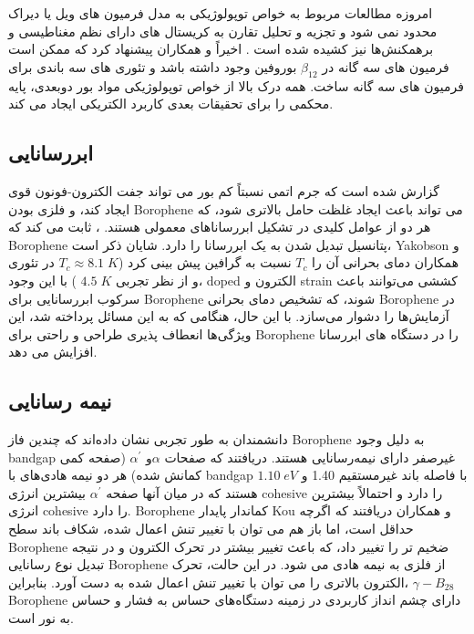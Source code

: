 امروزه مطالعات مربوط به خواص توپولوژیکی به مدل فرمیون های ویل یا دیراک محدود نمی شود و تجزیه و تحلیل تقارن به کریستال های دارای نظم مغناطیسی و برهمکنش‌ها نیز کشیده شده است \cite{bradlynDiracWeylFermions2016}. اخیراً  و همکاران \cite{ezawaTripletFermionsDirac2017} پیشنهاد کرد که ممکن است فرمیون های سه گانه در $\beta_{12}$ بوروفین وجود داشته باشد و تئوری های سه باندی برای فرمیون های سه گانه ساخت. همه درک بالا از خواص توپولوژیکی مواد بور دوبعدی، پایه محکمی را برای تحقیقات بعدی کاربرد الکتریکی ایجاد می کند.\cite{fanCatScradlelikeDirac2018}
\subsection{ابررسانایی}
گزارش شده است که جرم اتمی نسبتاً کم بور می تواند جفت الکترون-فونون قوی ایجاد کند، و فلزی بودن \gls{Borophene} می تواند باعث ایجاد غلظت حامل بالاتری شود، \cite{kortusSuperconductivityMetallicBoron2001, choiOriginAnomalousSuperconducting2002, anSuperconductivityMgB2Covalent2001} که هر دو از عوامل کلیدی در تشکیل ابررساناهای معمولی هستند. ، ثابت می کند که \gls{Borophene} پتانسیل تبدیل شدن به یک ابررسانا را دارد. شایان ذکر است، \gls{Yakobson} و همکاران \cite{penevCanTwoDimensionalBoron2016} دمای بحرانی آن را $T_c$ نسبت به گرافین پیش بینی کرد ($T_c \approx 8.1\; K$ در تئوری \cite{profetaPhononmediatedSuperconductivityGraphene2012} و از نظر تجربی $4.5\;K$ \cite{xueSuperconductivityPotassiumDopedFewLayer2012}) با این وجود، \gls{doped} الکترون و \gls{strain} کششی می‌توانند باعث سرکوب ابررسانایی برای \gls{Borophene} شوند، \cite{chengSuppressedSuperconductivitySubstratesupported2017, xiaoEnhancedSuperconductivityStrain2016}\cite{wuLithiumBoronLiBMonolayers2016} که تشخیص دمای بحرانی \gls{Borophene} در آزمایش‌ها را دشوار می‌سازد. با این حال، هنگامی که به این مسائل پرداخته شد، این ویژگی‌ها انعطاف پذیری طراحی و راحتی برای \gls{Borophene} را در دستگاه های ابررسانا افزایش می دهد.
\subsection{نیمه رسانایی}
دانشمندان به طور تجربی نشان داده‌اند که چندین فاز \gls{Borophene} به دلیل وجود \gls{bandgap} غیرصفر دارای نیمه‌رسانایی هستند. دریافتند که صفحات $\alpha$و $\alpha^{\prime}$ (صفحه کمی کمانش شده) هر دو نیمه هادی‌های با \gls{bandgap} با فاصله باند غیرمستقیم 1.40 و $1.10\; eV$ هستند که در میان آنها صفحه $\alpha^{\prime}$ بیشترین انرژی \gls{cohesive} را دارد و احتمالاً بیشترین انرژی \gls{cohesive} را دارد. \gls{Borophene} کماندار پایدار \gls{Kou} و همکاران \cite{kouHighmobilityAnisotropicTransport2016} دریافتند که اگرچه حداقل است، اما باز هم می توان با تغییر تنش اعمال شده، شکاف باند سطح \gls{Borophene} ضخیم تر را تغییر داد، که باعث تغییر بیشتر در تحرک الکترون و در نتیجه تبدیل نوع رسانایی \gls{Borophene} از فلزی به نیمه هادی می شود. در این حالت، تحرک الکترون بالاتری را می توان با تغییر تنش اعمال شده به دست آورد. بنابراین، $\gamma-B_{28}$ \gls{Borophene} دارای چشم انداز کاربردی در زمینه دستگاه‌های حساس به فشار و حساس به نور است.


